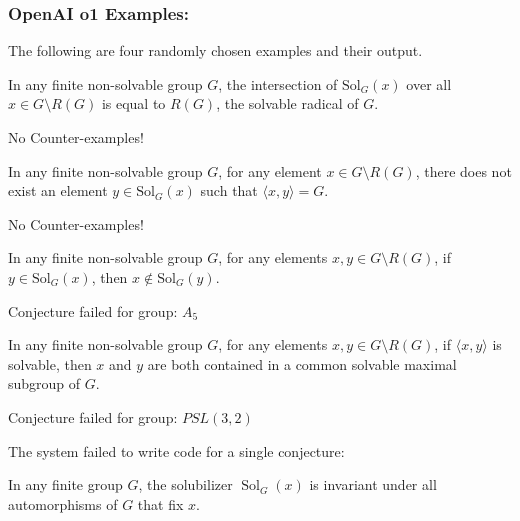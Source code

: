 \documentclass{article}
\begin{document}
\subsubsection{OpenAI o1 Examples:}
The following are four randomly chosen examples and their output. 
\begin{conj}
    In any finite non-solvable group \( G \), the intersection of \( \text{Sol}_G(x) \) over all \( x \in G \setminus R(G) \) is equal to \( R(G) \), the solvable radical of \( G \).
\end{conj}
\begin{codeout}
    No Counter-examples!
\end{codeout}
\begin{conj}
    In any finite non-solvable group \( G \), for any element \( x \in G \setminus R(G) \), there does not exist an element \( y \in \text{Sol}_G(x) \) such that \( \langle x, y \rangle = G \).
\end{conj}
\begin{codeout}
    No Counter-examples!
\end{codeout}
\begin{conj}
    In any finite non-solvable group \( G \), for any elements \( x, y \in G \setminus R(G) \), if \( y \in \text{Sol}_G(x) \), then \( x \notin \text{Sol}_G(y) \).
\end{conj}
\begin{codeout}
    Conjecture failed for group: $A_5$
\end{codeout}
\begin{conj}
    In any finite non-solvable group \( G \), for any elements \( x, y \in G \setminus R(G) \), if \( \langle x, y \rangle \) is solvable, then \( x \) and \( y \) are both contained in a common solvable maximal subgroup of \( G \).
\end{conj}
\begin{codeout}
    Conjecture failed for group: $PSL(3,2)$ 
\end{codeout}
The system failed to write code for a single conjecture:
\begin{conj}
    In any finite group \( G \), the solubilizer \( \operatorname{Sol}_G(x) \) is invariant under all automorphisms of \( G \) that fix \( x \).
\end{conj}
\end{document}
